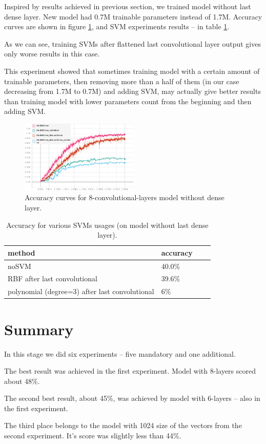 \documentclass[a4paper]{article}
\begin{document}
Inspired by results achieved in previous section,
we trained model without last dense layer.
New model had 0.7M trainable parameters instead of 1.7M.
Accuracy curves are shown in figure \ref{fig:noDense},
and SVM experiments results -- in table \ref{table:svm2}.

As we can see, training SVMs after flattened last convolutional
layer output gives only worse results in this case.

This experiment showed that sometimes training model with a certain
amount of trainable parameters, then removing more than a half
of them (in our case decreasing from 1.7M to 0.7M) and adding SVM,
may actually give better results than training model with lower
parameters count from the beginning and then adding SVM.

\begin{figure}[!h]
    \centering
    \includegraphics[page=2,width=0.5\textwidth]{noDense.png}
    \caption[]{Accuracy curves for 8-convolutional-layers model without dense layer.
    \label{fig:noDense}
    }
\end{figure}

\begin{table}[!hbt]
    \caption{Accuracy for various SVMs usages (on model without last dense layer).
    \label{table:svm2}
    }
\begin{center}
    \begin{tabular}{| l | l | l | l |}
    \hline
    method&accuracy \\
    \hline
        noSVM & 40.0\% \\
        RBF after last convolutional & 39.6\% \\
        polynomial (degree=3) after last convolutional & 6\% \\
    \hline
    \end{tabular}
\end{center}
\end{table}

\section{Summary}
In this stage we did six experiments -- five mandatory and one additional.

The best result was achieved in the first experiment. Model with 8-layers scored about 48\%.

The second best result, about  45\%, was achieved by model with 6-layers -- also in the first experiment.

The third place belongs to the model with 1024 size of the vectors from the second experiment. It’s score was slightly less than 44\%.
\end{document}
